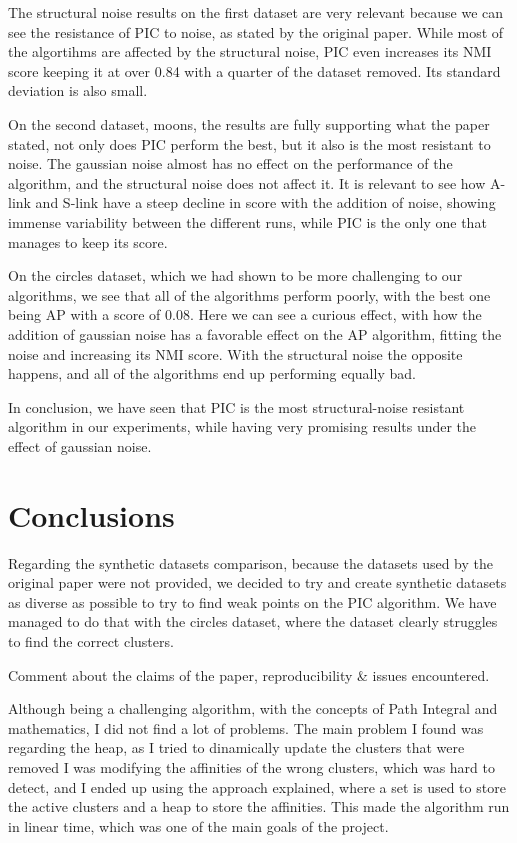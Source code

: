 \documentclass[
	10pt,
	parskip=half-,	
	paper=a4,
	english
	]{scrartcl}
\begin{document}
The structural noise results on the first dataset are very relevant because we can see the resistance of PIC to noise, as stated by the original paper. While most of the algortihms are affected by the structural noise, PIC even increases its NMI score keeping it at over 0.84 with a quarter of the dataset removed. Its standard deviation is also small.

On the second dataset, moons, the results are fully supporting what the paper stated, not only does PIC perform the best, but it also is the most resistant to noise. The gaussian noise almost has no effect on the performance of the algorithm, and the structural noise does not affect it. It is relevant to see how A-link and S-link have a steep decline in score with the addition of noise, showing immense variability between the different runs, while PIC is the only one that manages to keep its score.

On the circles dataset, which we had shown to be more challenging to our algorithms, we see that all of the algorithms perform poorly, with the best one being AP with a score of 0.08. Here we can see a curious effect, with how the addition of gaussian noise has a favorable effect on the AP algorithm, fitting the noise and increasing its NMI score. With the structural noise the opposite happens, and all of the algorithms end up performing equally bad.

In conclusion, we have seen that PIC is the most structural-noise resistant algorithm in our experiments, while having very promising results under the effect of gaussian noise.

\section{Conclusions}

Regarding the synthetic datasets comparison, because the datasets used by the original paper were not provided, we decided to try and create synthetic datasets as diverse as possible to try to find weak points on the PIC algorithm. We have managed to do that with the circles dataset, where the dataset clearly struggles to find the correct clusters.

Comment about the claims of the paper, reproducibility \& issues encountered.

Although being a challenging algorithm, with the concepts of Path Integral and mathematics, I did not find a lot of problems. The main problem I found was regarding the heap, as I tried to dinamically update the clusters that were removed I was modifying the affinities of the wrong clusters, which was hard to detect, and I ended up using the approach explained, where a set is used to store the active clusters and a heap to store the affinities. This made the algorithm run in linear time, which was one of the main goals of the project.
\end{document}
